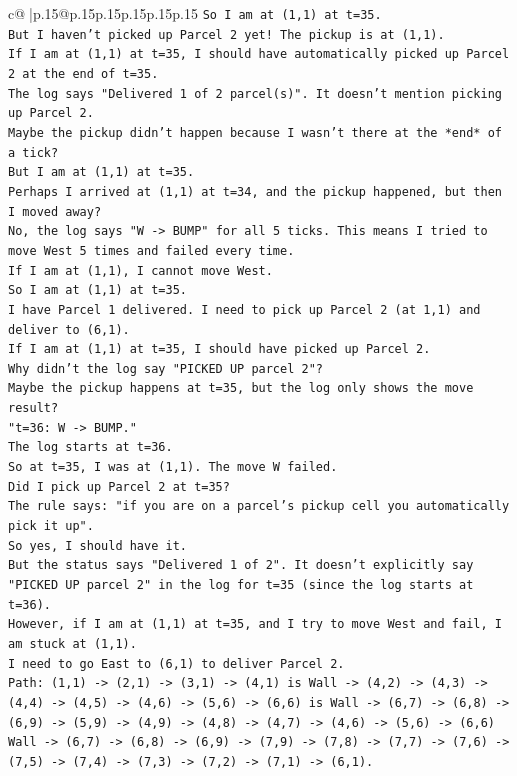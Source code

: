 \documentclass{article}
\begin{document}
{\begin{supertabular}{c@{$\;$}|p{.15\linewidth}@{}p{.15\linewidth}p{.15\linewidth}p{.15\linewidth}p{.15\linewidth}p{.15\linewidth}}
{{{\texttt{So I am at (1,1) at t=35.} \\
\texttt{But I haven't picked up Parcel 2 yet! The pickup is at (1,1).} \\
\texttt{If I am at (1,1) at t=35, I should have automatically picked up Parcel 2 at the end of t=35.} \\
\texttt{The log says "Delivered 1 of 2 parcel(s)". It doesn't mention picking up Parcel 2.} \\
\texttt{Maybe the pickup didn't happen because I wasn't there at the *end* of a tick?} \\
\texttt{But I am at (1,1) at t=35.} \\
\texttt{Perhaps I arrived at (1,1) at t=34, and the pickup happened, but then I moved away?} \\
\texttt{No, the log says "W {-}> BUMP" for all 5 ticks. This means I tried to move West 5 times and failed every time.} \\
\texttt{If I am at (1,1), I cannot move West.} \\
\texttt{So I am at (1,1) at t=35.} \\
\texttt{I have Parcel 1 delivered. I need to pick up Parcel 2 (at 1,1) and deliver to (6,1).} \\
\texttt{If I am at (1,1) at t=35, I should have picked up Parcel 2.} \\
\texttt{Why didn't the log say "PICKED UP parcel 2"?} \\
\texttt{Maybe the pickup happens at t=35, but the log only shows the move result?} \\
\texttt{"t=36: W {-}> BUMP."} \\
\texttt{The log starts at t=36.} \\
\texttt{So at t=35, I was at (1,1). The move W failed.} \\
\texttt{Did I pick up Parcel 2 at t=35?} \\
\texttt{The rule says: "if you are on a parcel's pickup cell you automatically pick it up".} \\
\texttt{So yes, I should have it.} \\
\texttt{But the status says "Delivered 1 of 2". It doesn't explicitly say "PICKED UP parcel 2" in the log for t=35 (since the log starts at t=36).} \\
\texttt{However, if I am at (1,1) at t=35, and I try to move West and fail, I am stuck at (1,1).} \\
\texttt{I need to go East to (6,1) to deliver Parcel 2.} \\
\texttt{Path: (1,1) {-}> (2,1) {-}> (3,1) {-}> (4,1) is Wall {-}> (4,2) {-}> (4,3) {-}> (4,4) {-}> (4,5) {-}> (4,6) {-}> (5,6) {-}> (6,6) is Wall {-}> (6,7) {-}> (6,8) {-}> (6,9) {-}> (5,9) {-}> (4,9) {-}> (4,8) {-}> (4,7) {-}> (4,6) {-}> (5,6) {-}> (6,6) Wall {-}> (6,7) {-}> (6,8) {-}> (6,9) {-}> (7,9) {-}> (7,8) {-}> (7,7) {-}> (7,6) {-}> (7,5) {-}> (7,4) {-}> (7,3) {-}> (7,2) {-}> (7,1) {-}> (6,1).} \\
}}}
\end{supertabular}}
\end{document}
